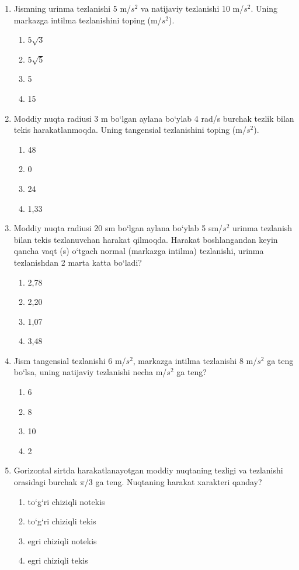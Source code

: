 \begin{enumerate}
\begin{enumerate}[label=\Alph*)]
\end{enumerate}

\item Jismning urinma tezlanishi 5 m/$s^2$ va natijaviy tezlanishi 10 m/$s^2$. Uning markazga intilma tezlanishini toping (m/$s^2$).
\begin{enumerate}[label=\Alph*)]
\item $5\sqrt{3}$
\item $5\sqrt{5}$
\item 5
\item 15

\end{enumerate}

\item Moddiy nuqta radiusi 3 m bo‘lgan aylana bo‘ylab 4 rad/s burchak tezlik bilan tekis harakatlanmoqda. Uning tangensial tezlanishini toping (m/$s^2$).
\begin{enumerate}[label=\Alph*)]
\item 48
\item 0
\item 24
\item 1,33
\end{enumerate}

\item Moddiy nuqta radiusi 20 sm bo‘lgan aylana bo‘ylab 5 sm/$s^2$ urinma tezlanish bilan tekis tezlanuvchan harakat qilmoqda. Harakat boshlangandan keyin qancha vaqt (s) o‘tgach normal (markazga intilma) tezlanishi, urinma tezlanishdan 2 marta katta bo‘ladi?
\begin{enumerate}[label=\Alph*)]
\item 2,78
\item 2,20
\item 1,07
\item 3,48

\end{enumerate}

\item Jism tangensial tezlanishi 6 m/$s^2$, markazga intilma tezlanishi 8 m/$s^2$ ga teng bo‘lsa, uning natijaviy tezlanishi necha m/$s^2$ ga teng?
\begin{enumerate}[label=\Alph*)]
\item 6
\item 8
\item 10
\item 2

\end{enumerate}

\item Gorizontal sirtda harakatlanayotgan moddiy nuqtaning tezligi va tezlanishi orasidagi burchak $\pi/3$ ga teng. Nuqtaning harakat xarakteri qanday?
\begin{enumerate}[label=\Alph*)]
\item to‘g‘ri chiziqli notekis
\item to‘g‘ri chiziqli tekis
\item egri chiziqli notekis
\item egri chiziqli tekis
\end{enumerate}


\end{enumerate}
